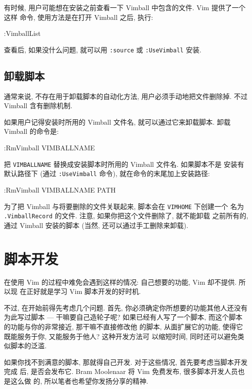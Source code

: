 有时候, 用户可能想在安装之前查看一下 Vimball 中包含的文件. Vim 提供了一个这样
命令, 使用方法是在打开 Vimball 之后, 执行:
\begin{vimcode}
:VimballList
\end{vimcode}

查看后, 如果没什么问题, 就可以用 \texttt{:source} 或 \texttt{:UseVimball}
安装.

\subsection{卸载脚本}
\label{subsec:uninstalling_scripts}

通常来说, 不存在用于卸载脚本的自动化方法, 用户必须手动地把文件删除掉. 不过
Vimball 含有删除机制.

如果用户记得安装时所用的 Vimball 文件名, 就可以通过它来卸载脚本. 卸载 Vimball
的命令是:
\begin{vimcode}
:RmVimball VIMBALLNAME
\end{vimcode}
把 \texttt{VIMBALLNAME} 替换成安装脚本时所用的 Vimball 文件名. 如果脚本不是
安装有默认路径下 (通过 \texttt{:UseVimball} 命令), 就在命令的末尾加上安装路径:
\begin{vimcode}
:RmVimball VIMBALLNAME PATH
\end{vimcode}

为了把 Vimball 与将要删除的文件关联起来, 脚本会在 \texttt{VIMHOME} 下创建一个
名为 \texttt{.VimballRecord} 的文件. 注意, 如果你把这个文件删除了, 就不能卸载
之前所有的, 通过 Vimball 安装的脚本 (当然, 还可以通过手工删除来卸载).

\section{脚本开发}
\label{sec:script_development}

在使用 Vim 的过程中难免会遇到这样的情况: 自己想要的功能, Vim 却不提供. 所以现
在正好就是学习 Vim 脚本开发的好时机.

不过, 在开始前得先考虑几个问题.
首先, 你必须确定你所想要的功能其他人还没有为此写过脚本 --- 干嘛要自己造轮子呢?
如果已经有人写了一个脚本, 而这个脚本的功能与你的非常接近, 那干嘛不直接修改他
的脚本, 从面扩展它的功能, 使得它既能服务于你, 又能服务于他人? 这种开发方法可
以缩短时间, 同时还可以避免类似脚本的泛滥.

如果你找不到满意的脚本, 那就得自己开发. 对于这些情况, 首先要考虑当脚本开发完成
后, 是否会发布它. Bram Moolenaar 将 Vim 免费发布, 很多脚本开发人员也是这么做
的, 所以笔者也希望你发扬分享的精神.

